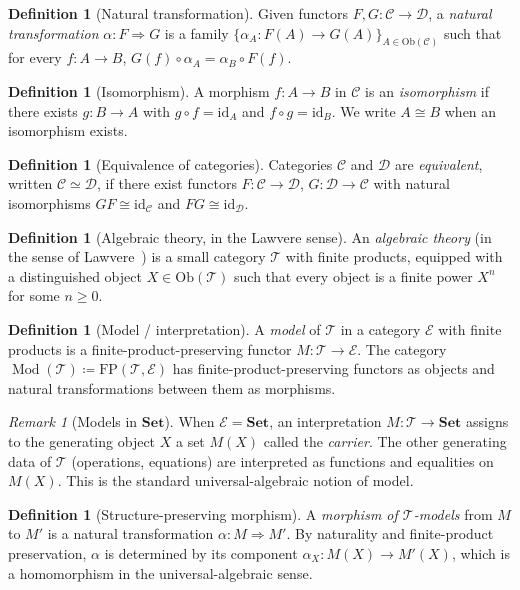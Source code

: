 \documentclass[12pt]{article}
\theoremstyle{definition}
\newtheorem{definition}[theorem]{Definition}
\theoremstyle{remark}
\newtheorem{remark}[theorem]{Remark}
\newcommand{\Set}{\mathbf{Set}}
\newcommand{\id}{\mathrm{id}}
\newcommand{\T}{\mathcal{T}}
\newcommand{\C}{\mathcal{C}}
\newcommand{\D}{\mathcal{D}}
\newcommand{\E}{\mathcal{E}}
\newcommand{\Mod}[1]{\operatorname{Mod}(#1)}
\newcommand{\eq}{\simeq}
\newcommand{\iso}{\cong}
\newcommand{\defeq}{\coloneqq}
\newcommand{\Ob}{\mathrm{Ob}}
\begin{document}
\begin{definition}[Natural transformation]
Given functors $F, G : \C \to \D$, a \emph{natural transformation} $\alpha : F \Rightarrow G$ is a family $\{\alpha_A : F(A) \to G(A)\}_{A \in \Ob(\C)}$ such that for every $f : A \to B$, $G(f) \circ \alpha_A = \alpha_B \circ F(f)$.
\end{definition}

\begin{definition}[Isomorphism]
A morphism $f : A \to B$ in $\C$ is an \emph{isomorphism} if there exists $g : B \to A$ with $g \circ f = \id_A$ and $f \circ g = \id_B$. We write $A \iso B$ when an isomorphism exists.
\end{definition}

\begin{definition}[Equivalence of categories]
Categories $\C$ and $\D$ are \emph{equivalent}, written $\C \eq \D$, if there exist functors $F : \C \to \D$, $G : \D \to \C$ with natural isomorphisms $G F \iso \id_\C$ and $F G \iso \id_\D$.
\end{definition}

\begin{definition}[Algebraic theory, in the Lawvere sense]\label{def:alg-theory}
An \emph{algebraic theory} (in the sense of Lawvere~\cite{Lawvere1963}) is a small category $\T$ with finite products, equipped with a distinguished object $X \in \Ob(\T)$ such that every object is a finite power $X^n$ for some $n \geq 0$.
\end{definition}

\begin{definition}[Model / interpretation]
A \emph{model} of $\T$ in a category $\E$ with finite products is a finite-product-preserving functor $M : \T \to \E$. The category $\Mod{\T} \defeq \mathrm{FP}(\T, \E)$ has finite-product-preserving functors as objects and natural transformations between them as morphisms.
\end{definition}

\begin{remark}[Models in $\Set$]
When $\E = \Set$, an interpretation $M : \T \to \Set$ assigns to the generating object $X$ a set $M(X)$ called the \emph{carrier}. The other generating data of $\T$ (operations, equations) are interpreted as functions and equalities on $M(X)$. This is the standard universal-algebraic notion of model.
\end{remark}

\begin{definition}[Structure-preserving morphism]
A \emph{morphism of $\T$-models} from $M$ to $M'$ is a natural transformation $\alpha : M \Rightarrow M'$. By naturality and finite-product preservation, $\alpha$ is determined by its component $\alpha_X : M(X) \to M'(X)$, which is a homomorphism in the universal-algebraic sense.
\end{definition}
\end{document}
